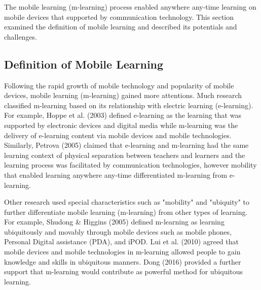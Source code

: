 The mobile learning (m-learning) process enabled anywhere any-time learning on mobile devices that supported by communication technology. This section examined the definition of mobile learning and described its potentials and challenges.


\subsection{Definition of Mobile Learning}

Following the rapid growth of mobile technology and popularity of mobile devices, mobile learning (m-learning) gained more attentions. Much research classified m-learning based on its relationship with electric learning (e-learning). For example, Hoppe et al. (2003) \cite{hoppe2003guest} defined e-learning as the learning that was supported by electronic devices and digital media while m-learning was the delivery of e-learning content via mobile devices and mobile technologies. Similarly, Petrova (2005) \cite{petrova2005mobile} claimed that e-learning and m-learning had the same learning context of physical separation between teachers and learners and the learning process was facilitated by communication technologies, however mobility that enabled learning anywhere any-time differentiated m-learning from e-learning. 

Other research used special characteristics such as "mobility" and "ubiquity" to further differentiate mobile learning (m-learning) from other types of learning. For example, Shudong \& Higgins (2005) \cite{shudong2005limitations} defined m-learning as learning ubiquitously and movably through mobile devices such as mobile phones, Personal Digital assistance (PDA), and iPOD. Lui et al. (2010) \cite{liu2010understanding} agreed that mobile devices and mobile technologies in m-learning allowed people to gain knowledge and skills in ubiquitous manners. Dong (2016) \cite{dong2016mobile} provided a further support that m-learning would contribute as powerful method for ubiquitous learning. 


